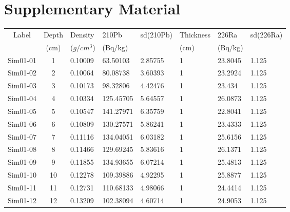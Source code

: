 \documentclass [11pt] {article}
\begin{document}
\section{Supplementary Material}
\label{sec:supp_mat}
\newpage
\begin{table}[H]
	\begin{tabular}{c|cllllll}
		Label    & Depth & Density  & 210Pb & sd(210Pb) & Thickness& 226Ra  & sd(226Ra) \\
		& (cm) &($g/cm^3$) &(Bq/kg)& & (cm) & (Bq/kg)&\\
		\hline 
		Sim01-01 & 1          & 0.10009                         & 63.50103      & 2.85755   & 1              & 23.8045       & 1.125     \\
		Sim01-02 & 2          & 0.10064                         & 80.08738      & 3.60393   & 1              & 23.2924       & 1.125     \\
		Sim01-03 & 3          & 0.10173                         & 98.32806      & 4.42476   & 1              & 23.434        & 1.125     \\
		Sim01-04 & 4          & 0.10334                         & 125.45705     & 5.64557   & 1              & 26.0873       & 1.125     \\
		Sim01-05 & 5          & 0.10547                         & 141.27971     & 6.35759   & 1              & 22.8041       & 1.125     \\
		Sim01-06 & 6          & 0.10809                         & 130.27571     & 5.86241   & 1              & 23.4333       & 1.125     \\
		Sim01-07 & 7          & 0.11116                         & 134.04051     & 6.03182   & 1              & 25.6156       & 1.125     \\
		Sim01-08 & 8          & 0.11466                         & 129.69245     & 5.83616   & 1              & 26.1371       & 1.125     \\
		Sim01-09 & 9          & 0.11855                         & 134.93655     & 6.07214   & 1              & 25.4813       & 1.125     \\
		Sim01-10 & 10         & 0.12278                         & 109.39886     & 4.92295   & 1              & 25.8877       & 1.125     \\
		Sim01-11 & 11         & 0.12731                         & 110.68133     & 4.98066   & 1              & 24.4414       & 1.125     \\
		Sim01-12 & 12         & 0.13209                         & 102.38094     & 4.60714   & 1              & 24.9053       & 1.125     \\

\end{tabular}
\end{table}
\end{document}
